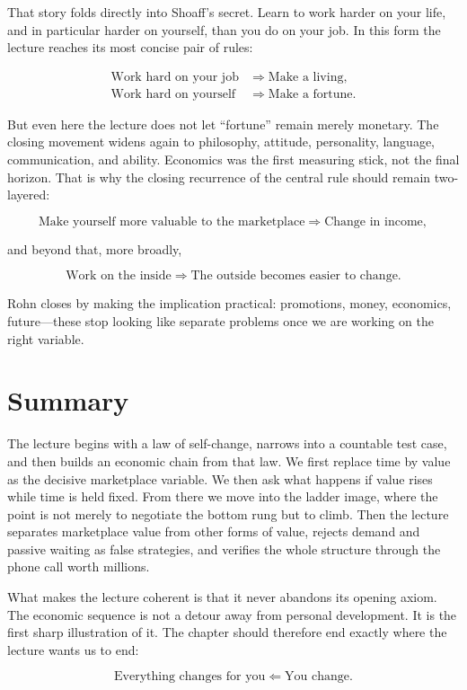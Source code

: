 That story folds directly into Shoaff's secret. Learn to work harder on your life, and in particular harder on yourself, than you do on your job. In this form the lecture reaches its most concise pair of rules:

\begin{align}
\text{Work hard on your job} &\Longrightarrow \text{Make a living},\\
\text{Work hard on yourself} &\Longrightarrow \text{Make a fortune}.
\end{align}

But even here the lecture does not let ``fortune'' remain merely monetary. The closing movement widens again to philosophy, attitude, personality, language, communication, and ability. Economics was the first measuring stick, not the final horizon. That is why the closing recurrence of the central rule should remain two-layered:

\begin{equation}
\text{Make yourself more valuable to the marketplace} \Longrightarrow \text{Change in income},
\end{equation}

and beyond that, more broadly,

\begin{equation}
\text{Work on the inside} \Longrightarrow \text{The outside becomes easier to change}.
\end{equation}

Rohn closes by making the implication practical: promotions, money, economics, future---these stop looking like separate problems once we are working on the right variable.

\section{Summary}

The lecture begins with a law of self-change, narrows into a countable test case, and then builds an economic chain from that law. We first replace time by value as the decisive marketplace variable. We then ask what happens if value rises while time is held fixed. From there we move into the ladder image, where the point is not merely to negotiate the bottom rung but to climb. Then the lecture separates marketplace value from other forms of value, rejects demand and passive waiting as false strategies, and verifies the whole structure through the phone call worth millions.

What makes the lecture coherent is that it never abandons its opening axiom. The economic sequence is not a detour away from personal development. It is the first sharp illustration of it. The chapter should therefore end exactly where the lecture wants us to end:

\begin{equation}
\text{Everything changes for you} \Longleftarrow \text{You change}.
\end{equation}